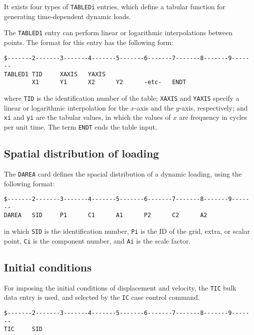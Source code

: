 It exists four types of \texttt{TABLEDi} entries, which define a tabular function for generating time-dependent dynamic loads.

The \texttt{TABLED1} entry can perform linear or logarithmic interpolations between points. The format for this entry has the following form:

\begin{lstlisting}
$-------2-------3-------4-------5-------6-------7-------8-------9-------
TABLED1 TID     XAXIS   YAXIS
        X1      Y1      X2      Y2      -etc-   ENDT
\end{lstlisting}

where \texttt{TID} is the identification number of the table; \texttt{XAXIS} and \texttt{YAXIS} specify a linear or logarithmic interpolation for the $x$-axis and the $y$-axis, respectively; and \texttt{xi} and \texttt{yi} are the tabular values, in which the values of $x$ are frequency in cycles per unit time. The term \texttt{ENDT} ends the table input.

\subsection{Spatial distribution of loading}

The \texttt{DAREA} card defines the spacial distribution of a dynamic loading, using the following format:

\begin{lstlisting}
$-------2-------3-------4-------5-------6-------7-------8-------9-------
DAREA   SID     P1      C1      A1      P2      C2      A2
\end{lstlisting}

in which \texttt{SID} is the identification number, \texttt{Pi} is the ID of the grid, extra, or scalar point, \texttt{Ci} is the component number, and \texttt{Ai} is the scale factor.

\subsection{Initial conditions}

For imposing the initial conditions of displacement and velocity, the \texttt{TIC} bulk data entry is used, and selected by the \texttt{IC} case control command.

\begin{lstlisting}
$-------2-------3-------4-------5-------6-------7-------8-------9-------
TIC     SID     
\end{lstlisting}

